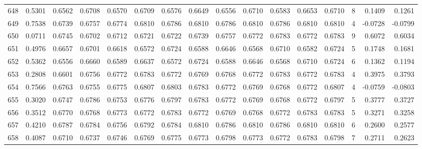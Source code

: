 \begin{tabular}{lrrrrrrrrrrrrrrr}
648 &      0.5301 &  0.6562 &  0.6708 &  0.6570 &  0.6709 &  0.6576 &  0.6649 &  0.6556 &  0.6710 &  0.6583 &   0.6653 &     0.6710 &      8 &                    0.1409 &                     0.1261 \\
649 &      0.7538 &  0.6739 &  0.6757 &  0.6774 &  0.6810 &  0.6786 &  0.6810 &  0.6786 &  0.6810 &  0.6786 &   0.6810 &     0.6810 &      4 &                   -0.0728 &                    -0.0799 \\
650 &      0.0711 &  0.6745 &  0.6702 &  0.6712 &  0.6721 &  0.6722 &  0.6739 &  0.6757 &  0.6772 &  0.6783 &   0.6772 &     0.6783 &      9 &                    0.6072 &                     0.6034 \\
651 &      0.4976 &  0.6657 &  0.6701 &  0.6618 &  0.6572 &  0.6724 &  0.6588 &  0.6646 &  0.6568 &  0.6710 &   0.6582 &     0.6724 &      5 &                    0.1748 &                     0.1681 \\
652 &      0.5362 &  0.6556 &  0.6660 &  0.6589 &  0.6637 &  0.6572 &  0.6724 &  0.6588 &  0.6646 &  0.6568 &   0.6710 &     0.6724 &      6 &                    0.1362 &                     0.1194 \\
653 &      0.2808 &  0.6601 &  0.6756 &  0.6772 &  0.6783 &  0.6772 &  0.6769 &  0.6768 &  0.6772 &  0.6783 &   0.6772 &     0.6783 &      4 &                    0.3975 &                     0.3793 \\
654 &      0.7566 &  0.6763 &  0.6755 &  0.6775 &  0.6807 &  0.6803 &  0.6783 &  0.6772 &  0.6769 &  0.6768 &   0.6772 &     0.6807 &      4 &                   -0.0759 &                    -0.0803 \\
655 &      0.3020 &  0.6747 &  0.6786 &  0.6753 &  0.6776 &  0.6797 &  0.6783 &  0.6772 &  0.6769 &  0.6768 &   0.6772 &     0.6797 &      5 &                    0.3777 &                     0.3727 \\
656 &      0.3512 &  0.6770 &  0.6768 &  0.6773 &  0.6772 &  0.6783 &  0.6772 &  0.6769 &  0.6768 &  0.6772 &   0.6783 &     0.6783 &      5 &                    0.3271 &                     0.3258 \\
657 &      0.4210 &  0.6787 &  0.6784 &  0.6756 &  0.6792 &  0.6784 &  0.6810 &  0.6786 &  0.6810 &  0.6786 &   0.6810 &     0.6810 &      6 &                    0.2600 &                     0.2577 \\
658 &      0.4087 &  0.6710 &  0.6737 &  0.6746 &  0.6769 &  0.6775 &  0.6773 &  0.6798 &  0.6773 &  0.6772 &   0.6783 &     0.6798 &      7 &                    0.2711 &                     0.2623 \\

\end{tabular}
